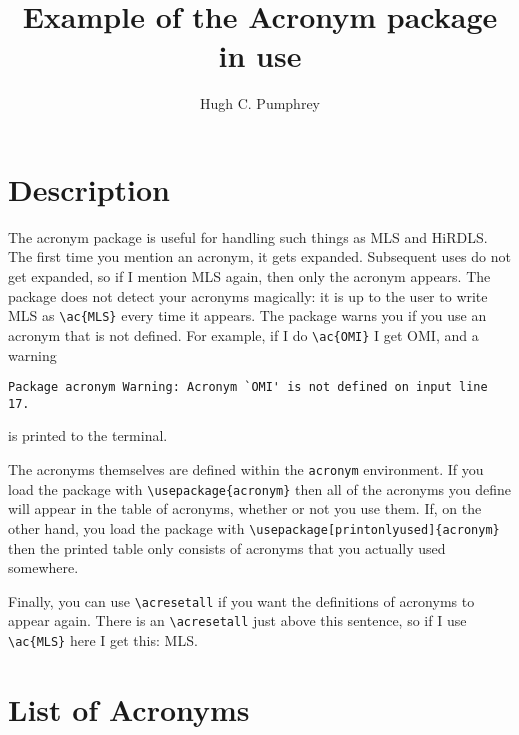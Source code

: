 \documentclass{article}
\title{Example of the Acronym package in use}
\author{Hugh C. Pumphrey}
\begin{document}
\maketitle
\section{Description}
The acronym package is useful for handling such things as \ac{MLS} and
\ac{HiRDLS}. The first time you mention an acronym, it gets
expanded. Subsequent uses do not get expanded, so if I mention
\ac{MLS} again, then only the acronym appears. The package does not
detect your acronyms magically: it is
up to the user to write \ac{MLS} as \verb+\ac{MLS}+ every time it
appears. The package warns you if you use an acronym that is not
defined. For example, if I do \verb+\ac{OMI}+  I  get \ac{OMI}, and a
warning 
\begin{verbatim}
Package acronym Warning: Acronym `OMI' is not defined on input line 17.
\end{verbatim}
is printed to the terminal.

The acronyms themselves are defined within the \texttt{acronym}
environment. If you load the package with \verb+\usepackage{acronym}+
then all of the acronyms you define will appear in the table of
acronyms, whether or not you use them. If, on the other hand, you load
the package with \verb+\usepackage[printonlyused]{acronym}+ then the
printed table only consists of acronyms that you actually used
somewhere. 

\acresetall
Finally, you can use  \verb+\acresetall+ if you want the definitions
of acronyms to appear again. There is an  \verb+\acresetall+ just
above this sentence, so if I use \verb+\ac{MLS}+ here I get this: \ac{MLS}.

\section*{List of Acronyms}
\begin{acronym}
\end{acronym}
\end{document}
